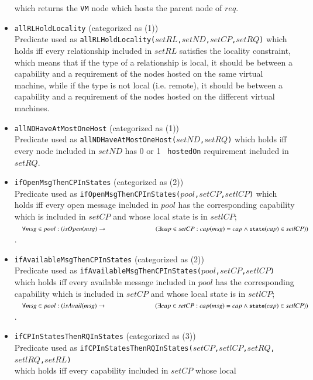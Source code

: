 \documentclass[12pt]{report}
\newcommand{\ra}{\rightarrow}
\newcommand{\mbstt}[1]{\mbox{\small{\tt {#1}}}}
\newcommand{\stt}[1]{{\small{\tt {#1}}}}
\begin{document}
\begin{itemize}
 which returns the {\tt VM} node which hosts the parent node of $req$.
\item \stt{allRLHoldLocality} (categorized as (1))\\ 
  Predicate used as
  \stt{allRLHoldLocality($setRL$,$setND$,$setCP$,$setRQ$)} which holds
  iff every relationship included in $setRL$ satisfies the locality
  constraint, which means that if the type of a relationship is local,
  it should be between a capability and a requirement of the nodes
  hosted on the same virtual machine, while if the type is not local
  (i.e. remote), it should be between a capability and a requirement
  of the nodes hosted on the different virtual machines.
\item \stt{allNDHaveAtMostOneHost} (categorized as (1))\\ 
  Predicate used as \stt{allNDHaveAtMostOneHost($setND$,$setRQ$)}
  which holds iff every node included in $setND$ has 0 or 1 {\tt
    hostedOn} requirement included in $setRQ$.
\item \stt{ifOpenMsgThenCPInStates} (categorized as (2))\\ 
  Predicate used as
  \stt{ifOpenMsgThenCPInStates($pool$,$setCP$,$setlCP$)} which holds
  iff every open message included in $pool$ has the corresponding
  capability which is included in $setCP$ and whose local state is in
  $setlCP$;\\ $~~~~\forall msg\in pool:(isOpen(msg)\ra\\
  ~~~~~~~~~~~~~~~~~~~~~~~~~~~~~~(\exists cap\in setCP:
  cap(msg)=cap\land \mbstt{state}(cap)\in setlCP))$.
\item \stt{ifAvailableMsgThenCPInStates} (categorized as (2))\\ 
  Predicate used as
  \stt{ifAvailableMsgThenCPInStates($pool$,$setCP$,$setlCP$)} which
  holds iff every available message included in $pool$ has the
  corresponding capability which is included in $setCP$ and whose
  local state is in $setlCP$;\\ $~~~~\forall msg\in
  pool:(isAvail(msg)\ra\\ ~~~~~~~~~~~~~~~~~~~~~~~~~~~~~~(\exists cap\in setCP:
  cap(msg)=cap\land \mbstt{state}(cap)\in setlCP))$.
\item \stt{ifCPInStatesThenRQInStates} (categorized as (3))\\ 
  Predicate used as
  \stt{ifCPInStatesThenRQInStates($setCP$,$setlCP$,$setRQ$,$setlRQ$,$setRL$)}
  \\which holds iff every capability included in $setCP$ whose local

\end{itemize}
\end{document}
